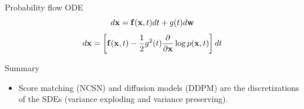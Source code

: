 \begin{frame}{Probability flow ODE}
	\[
		d\mathbf{x} = \mathbf{f}(\mathbf{x}, t) dt + g(t) d \mathbf{w}
	\] 	
	\[
		d\mathbf{x} = \left[\mathbf{f}(\mathbf{x}, t) -\frac{1}{2} g^2(t) \frac{\partial}{\partial \mathbf{x}} \log p(\mathbf{x}, t) \right] dt
	\]
\end{frame}
\begin{frame}{Summary}
	\begin{itemize}
		\item Score matching (NCSN) and diffusion models (DDPM) are the discretizations of the SDEs (variance exploding and variance preserving).
	\end{itemize}
\end{frame}
 
